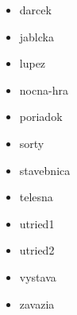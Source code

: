 



\begin{itemize}
\item darcek
\item jablcka
\item lupez
\item nocna-hra
\item poriadok
\item sorty
\item stavebnica
\item telesna
\item utried1
\item utried2
\item vystava
\item zavazia
\end{itemize}

